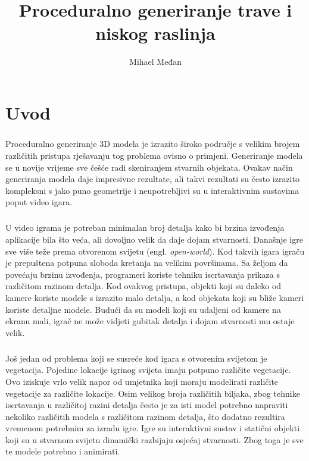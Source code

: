 \documentclass[times, utf8, diplomski]{fer}
\begin{document}

\title{Proceduralno generiranje trave i niskog raslinja}
\author{Mihael Međan}

\maketitle



\zahvala{}

\tableofcontents

\chapter{Uvod}
\paragraph{}
Proceduralno generiranje 3D modela je izrazito široko područje s velikim brojem različitih 
pristupa rješavanju tog problema ovisno o primjeni. Generiranje modela se u novije vrijeme 
sve češće radi skeniranjem stvarnih objekata. Ovakav način generiranja modela daje 
impresivne rezultate, ali takvi rezultati su često izrazito kompleksni s jako puno 
geometrije i neupotrebljivi su u interaktivnim sustavima poput video igara. 

\paragraph{}
U video igrama je potreban minimalan broj detalja kako bi brzina izvođenja aplikacije bila 
što veća, ali dovoljno velik da daje dojam stvarnosti. Današnje igre sve više teže prema 
otvorenom svijetu (engl. \textit{open-world}). Kod takvih igara igraču je prepuštena potpuna 
sloboda kretanja na velikim površinama. Sa željom da povećaju brzinu izvođenja, programeri 
koriste tehniku iscrtavanja prikaza s različitom razinom detalja. Kod ovakvog pristupa, 
objekti koji su daleko od kamere koriste modele s izrazito malo detalja, a kod objekata 
koji su bliže kameri koriste detaljne modele. Budući da su modeli koji su udaljeni od kamere 
na ekranu mali, igrač ne može vidjeti gubitak detalja i dojam stvarnosti mu ostaje velik.

\paragraph{}
Još jedan od problema koji se susreće kod igara s otvorenim svijetom je vegetacija. Pojedine 
lokacije igrinog svijeta imaju potpuno različite vegetacije. Ovo iziskuje vrlo velik napor 
od umjetnika koji moraju modelirati različite vegetacije za različite lokacije. Osim velikog 
broja različitih biljaka, zbog tehnike iscrtavanja u različitoj razini detalja često je za 
isti model potrebno napraviti nekoliko različitih modela s različitom razinom detalja, što 
dodatno rezultira vremenom potrebnim za izradu igre. Igre su interaktivni sustav i statični 
objekti koji su u stvarnom svijetu dinamički razbijaju osjećaj stvarnosti. Zbog toga je sve 
te modele potrebno i animirati.
\end{document}

